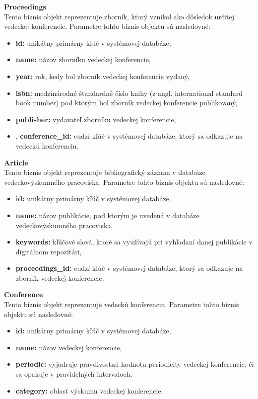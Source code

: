 \documentclass[10pt,oneside,slovak,a4paper]{article}
\begin{document}
\textbf{Proceedings}\\
Tento biznis objekt reprezentuje zborník, ktorý vznikol ako dôsledok určitej vedeckej konferencie. Parametre tohto biznis objektu sú nasledovné:

\begin{itemize}
\item \textbf{id:} unikátny primárny kľúč v systémovej databáze,
\item \textbf{name:} názov zborníku vedeckej konferencie,
\item \textbf{year:} rok, kedy bol zborník vedeckej konferencie vydaný,
\item \textbf{isbn:} medzinárodné štandardné číslo knihy (z angl. international standard book number) pod ktorým bol zborník vedeckej konferencie publikovaný,
\item \textbf{publisher:} vydavateľ zborníku vedeckej konferencie,
\item, \textbf{conference\_id:} cudzí kľúč v systémovej databáze, ktorý sa odkazuje na vedeckú konferenciu.
\end{itemize}

\textbf{Article}\\
Tento biznis objekt reprezentuje bibliografický záznam v databáze vedeckovýskumného pracoviska. Parametre tohto biznis objektu sú nasledovné:

\begin{itemize}
\item \textbf{id:} unikátny primárny kľúč v systémovej databáze,
\item \textbf{name:} názov publikácie, pod ktorým je uvedená v databáze vedeckovýskumného pracoviska,
\item \textbf{keywords:} kľúčové slová, ktoré sa využívajú pri vyhľadaní danej publikácie v digitálnom repozitári,
\item \textbf{proceedings\_id:} cudzí kľúč v systémovej databáze, ktorý sa odkazuje na zborník vedeckej konferencie.
\end{itemize}

\textbf{Conference}\\
Tento biznis objekt reprezentuje vedeckú konferenciu. Parametre tohto biznis objektu sú nasledovné:

\begin{itemize}
\item \textbf{id:} unikátny primárny kľúč v systémovej databáze,
\item \textbf{name:} názov vedeckej konferencie,
\item \textbf{periodic:} vyjadruje pravdivostnú hodnotu periodicity vedeckej konferencie, či sa opakuje v pravidelných intervaloch,
\item \textbf{category:} oblasť výskumu vedeckej konferencie.
\end{itemize}
\end{document}
